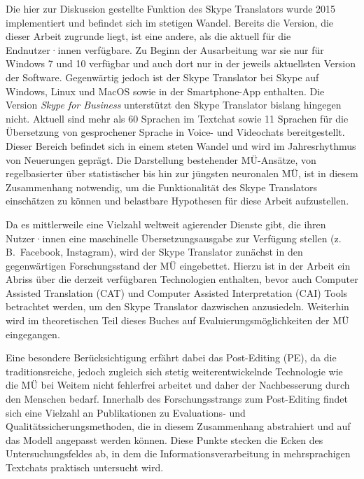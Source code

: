Die hier zur Diskussion gestellte Funktion des Skype Translators wurde 2015 implementiert und befindet sich im stetigen Wandel. Bereits die Version, die dieser Arbeit zugrunde liegt, ist eine andere, als die aktuell für die Endnutzer·innen verfügbare. Zu Beginn der Ausarbeitung war sie nur für Windows 7 und 10 verfügbar und auch dort nur in der jeweils aktuellsten Version der Software. Gegenwärtig jedoch ist der Skype Translator bei Skype auf Windows, Linux und MacOS sowie in der Smartphone-App enthalten. Die Version \emph{Skype for Business} unterstützt den Skype Translator bislang hingegen nicht. Aktuell sind mehr als 60 Sprachen im Textchat sowie 11 Sprachen für die Übersetzung von gesprochener Sprache in Voice- und Videochats bereitgestellt. Dieser Bereich befindet sich in einem steten Wandel und wird im Jahresrhythmus von Neuerungen geprägt. Die Darstellung bestehender MÜ-Ansätze, von regelbasierter über statistischer bis hin zur jüngsten neuronalen MÜ, ist in diesem Zusammenhang notwendig, um die Funktionalität des Skype Translators einschätzen zu können und belastbare Hypothesen für diese Arbeit aufzustellen.

Da es mittlerweile eine Vielzahl weltweit agierender Dienste gibt, die ihren Nutzer·innen eine maschinelle Übersetzungsausgabe zur Verfügung stellen (z.\,B.\ Facebook, Instagram), wird der Skype Translator zunächst in den gegenwärtigen Forschungsstand der MÜ eingebettet. Hierzu ist in der Arbeit ein Abriss über die derzeit verfügbaren Technologien enthalten, bevor auch Computer Assisted Translation (CAT) und Computer Assisted Interpretation (CAI) Tools betrachtet werden, um den Skype Translator dazwischen anzusiedeln. Weiterhin wird im theoretischen Teil dieses Buches auf Evaluierungsmöglichkeiten der MÜ eingegangen.

Eine besondere Berücksichtigung erfährt dabei das Post-Editing (PE), da die traditionsreiche, jedoch zugleich sich stetig weiterentwickelnde Technologie wie die MÜ bei Weitem nicht fehlerfrei arbeitet und daher der Nachbesserung durch den Menschen bedarf. Innerhalb des Forschungsstrangs zum Post-Editing findet sich eine Vielzahl an Publikationen zu Evaluations- und Qualitätssicherungsmethoden, die in diesem Zusammenhang abstrahiert und auf das Modell angepasst werden können. Diese Punkte stecken die Ecken des Untersuchungsfeldes ab, in dem die Informationsverarbeitung in mehrsprachigen Textchats praktisch untersucht wird.

